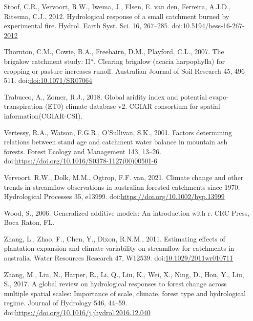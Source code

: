 \documentclass[]{elsarticle} %
\newlength{\cslhangindent}
\newlength{\cslentryspacingunit} %
\newenvironment{CSLReferences}[2] %
 {%
  \setlength{\parindent}{0pt}
  \ifodd #1
  \let\oldpar\par
  \def\par{\hangindent=\cslhangindent\oldpar}
  \fi
  \setlength{\parskip}{#2\cslentryspacingunit}
 }%
 {}
\begin{document}
\begin{CSLReferences}{1}{0}
\leavevmode{}%
Stoof, C.R., Vervoort, R.W., Iwema, J., Elsen, E. van den, Ferreira, A.J.D., Ritsema, C.J., 2012. Hydrological response of a small catchment burned by experimental fire. Hydrol. Earth Syst. Sci. 16, 267--285. doi:\href{https://doi.org/10.5194/hess-16-267-2012}{10.5194/hess-16-267-2012}

\leavevmode{}%
Thornton, C.M., Cowie, B.A., Freebairn, D.M., Playford, C.L., 2007. The brigalow catchment study: II*. Clearing brigalow (acacia harpophylla) for cropping or pasture increases runoff. Australian Journal of Soil Research 45, 496--511. doi:\href{https://doi.org/doi:10.1071/SR07064}{doi:10.1071/SR07064}

\leavevmode{}%
Trabucco, A., Zomer, R.J., 2018. Global aridity index and potential evapo-transpiration (ET0) climate database v2. CGIAR consortium for spatial information(CGIAR-CSI).

\leavevmode{}%
Vertessy, R.A., Watson, F.G.R., O'Sullivan, S.K., 2001. Factors determining relations between stand age and catchment water balance in mountain ash forests. Forest Ecology and Management 143, 13--26. doi:\url{https://doi.org/10.1016/S0378-1127(00)00501-6}

\leavevmode{}%
Vervoort, R.W., Dolk, M.M., Ogtrop, F.F. van, 2021. Climate change and other trends in streamflow observations in australian forested catchments since 1970. Hydrological Processes 35, e13999. doi:\url{https://doi.org/10.1002/hyp.13999}

\leavevmode{}%
Wood, S., 2006. Generalized additive models: An introduction with r. CRC Press, Boca Raton, FL.

\leavevmode{}%
Zhang, L., Zhao, F., Chen, Y., Dixon, R.N.M., 2011. Estimating effects of plantation expansion and climate variability on streamflow for catchments in australia. Water Resources Research 47, W12539. doi:\href{https://doi.org/10.1029/2011wr010711}{10.1029/2011wr010711}

\leavevmode{}%
Zhang, M., Liu, N., Harper, R., Li, Q., Liu, K., Wei, X., Ning, D., Hou, Y., Liu, S., 2017. A global review on hydrological responses to forest change across multiple spatial scales: Importance of scale, climate, forest type and hydrological regime. Journal of Hydrology 546, 44--59. doi:\url{https://doi.org/10.1016/j.jhydrol.2016.12.040}


\end{CSLReferences}
\end{document}
